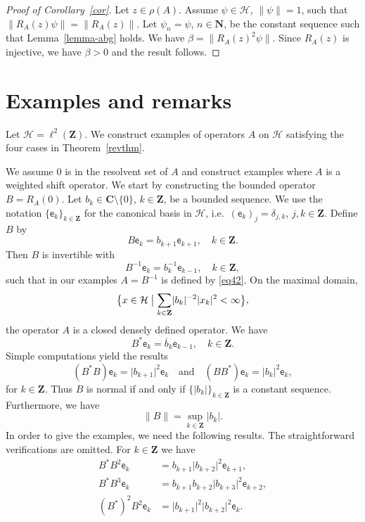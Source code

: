 \documentclass[12pt,a4paper]{article}
\numberwithin{equation}{section}
\theoremstyle{plain}
\theoremstyle{definition}
\newcommand{\abs}[1]{\lvert{#1}\rvert}  %
\newcommand{\norm}[1]{\lVert{#1}\rVert} %
\newcommand{\cH}{\mathcal{H}}
\newcommand{\bC}{\mathbf{C}}
\newcommand{\bN}{\mathbf{N}}
\newcommand{\bZ}{\mathbf{Z}}
\newcommand{\be}[1]{\mathsf{e}_{#1}}
\begin{document}
\begin{proof}[Proof of Corollary~\ref{cor}]
	Let $z\in\rho(A)$. Assume $\psi\in\cH$, $\norm{\psi}=1$, such that $\norm{R_A(z)\psi}=\norm{R_A(z)}$. Let $\psi_n=\psi$, $n\in\bN$, be the constant sequence such that Lemma~\ref{lemma-abg} holds. We have $\beta=\norm{R_A(z)^2\psi}$. Since $R_A(z)$ is injective, we have $\beta>0$ and the result follows.
\end{proof}

\section{Examples and remarks}\label{sect3}

Let $\cH=\ell^2(\bZ)$.  We construct examples of operators $A$ on $\cH$ satisfying the four cases in Theorem~\ref{revthm}.

We assume $0$ is in the resolvent set of $A$ and construct examples where $A$ is a weighted shift operator. We start by constructing the bounded operator $B=R_A(0)$. Let $b_k\in\bC\setminus\{0\}$, $k\in\bZ$, be a bounded sequence. We use the notation $\{\be{k}\}_{k\in\bZ}$ for the canonical basis in $\cH$, i.e.~$(\be{k})_j=\delta_{j,k}$, $j,k\in\bZ$. Define $B$ by
%
\begin{equation}\label{eq41}
	B\be{k}=b_{k+1}\be{k+1},\quad k\in\bZ.
\end{equation}
%
Then $B$ is invertible with
%
\begin{equation}\label{eq42}
	B^{-1}\be{k}=b_{k}^{-1}\be{k-1},\quad k\in\bZ,
\end{equation}
%
such that in our examples $A=B^{-1}$ is defined by \eqref{eq42}. On the maximal domain,
%
\begin{equation*}
	\bigl\{ x\in\cH \bigm| \sum_{k\in\bZ}\abs{b_{k}}^{-2}\abs{x_k}^2<\infty \bigr\},
\end{equation*}
%
the operator $A$ is a closed densely defined operator. We have
%
\begin{equation*}
	B^{\ast}\be{k}=\overline{b}_{k}\be{k-1},\quad k\in\bZ.
\end{equation*}
%
Simple computations yield the results
%
\begin{equation}
	(B^{\ast}B)\be{k}=\abs{b_{k+1}}^2\be{k} \quad\text{and}\quad (BB^{\ast})\be{k}=\abs{b_{k}}^2\be{k},\label{eq44}
\end{equation}
%
for $k\in\bZ$. Thus $B$ is normal if and only if $\{\abs{b_k}\}_{k\in\bZ}$ is a constant sequence. Furthermore, we have 
%
\begin{equation*}
	\norm{B}=\sup_{k\in\bZ}\abs{b_k}.
\end{equation*}
%
In order to give the examples, we need the following results. The straightforward verifications are omitted. For $k\in\bZ$ we have
%
\begin{align}
	B^{\ast}B^2\be{k}&=b_{k+1}\abs{b_{k+2}}^2\be{k+1},\label{eq47} \\
	B^{\ast}B^3\be{k}&=b_{k+1}b_{k+2}\abs{b_{k+3}}^2\be{k+2},\label{eq48} \\
	(B^{\ast})^2B^2\be{k}&=\abs{b_{k+1}}^2\abs{b_{k+2}}^2\be{k}.\label{eq49}
\end{align}
\end{document}

